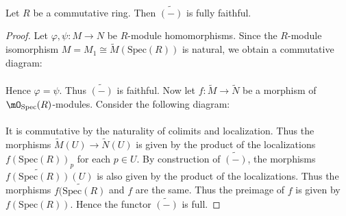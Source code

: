 \documentclass[a4paper]{article}
\begin{document}
\begin{prp}{}{}\\
Let $R$ be a commutative ring. Then $\widetilde{(-)}$ is fully faithful. 
\begin{proof}
Let $\varphi,\psi:M\to N$ be $R$-module homomorphisms. Since the $R$-module isomorphism $M=M_1\cong\widetilde{M}(\text{Spec}(R))$ is natural, we obtain a commutative diagram: \\
\\
Hence $\varphi=\psi$. Thus $\widetilde{(-)}$ is faithful. Now let $f:\widetilde{M}\to\widetilde{N}$ be a morphism of $\mO_\text{Spec}(R)$-modules. Consider the following diagram: \\
\\
It is commutative by the naturality of colimits and localization. Thus the morphisms $\widetilde{M}(U)\to\widetilde{N}(U)$ is given by the product of the localizations $f(\text{Spec}(R))_p$ for each $p\in U$. By construction of $\widetilde{(-)}$, the morphisms $\widetilde{f(\text{Spec}(R))}(U)$ is also given by the product of the localizations. Thus the morphisms $\widetilde{f(\text{Spec}(R)}$ and $f$ are the same. Thus the preimage of $f$ is given by $f(\text{Spec}(R))$. Hence the functor $\widetilde{(-)}$ is full. 
\end{proof}
\end{prp}
\end{document}
